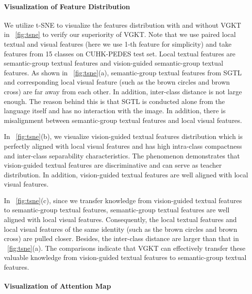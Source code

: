 \paragraph{Visualization of Feature Distribution}


We utilize t-SNE to visualize the features distribution with and without VGKT in \figurename~\ref{fig:tsne} to verify our superiority of VGKT.
Note that we use paired local textual and visual features (here we use 1-th feature for simplicity) and take features from 15 classes on CUHK-PEDES test set. Local textual features are semantic-group textual features and vision-guided semantic-group textual features.
As shown in \figurename~\ref{fig:tsne}(a), semantic-group textual features from SGTL and corresponding local visual feature (such as the brown circles and brown cross) are far away from each other. 
In addition, inter-class distance is not large enough. The reason behind this is that SGTL is conducted alone from the language itself and has no interaction with the image. In addition, there is misalignment between semantic-group textual features and local visual features.
 
In \figurename~\ref{fig:tsne}(b), we visualize vision-guided textual features distribution which is perfectly aligned with local visual features and has high intra-class compactness and inter-class separability characteristics.
The phenomenon demonstrates that vision-guided textual features are discriminative and can serve as teacher distribution. In addition, vision-guided textual features are well aligned with local visual features.

In \figurename~\ref{fig:tsne}(c), 
since we transfer knowledge from vision-guided textual features to semantic-group textual features, semantic-group textual features are well aligned with local visual features. 
Consequently, the local textual features and local visual features of the same identity (such as the brown circles and brown cross) are pulled closer. Besides, the inter-class distance are larger than that in \figurename~\ref{fig:tsne}(a). The comparisons indicate that VGKT can effectively transfer these valuable knowledge from vision-guided textual features to semantic-group textual features.






\paragraph{Visualization of Attention Map}

